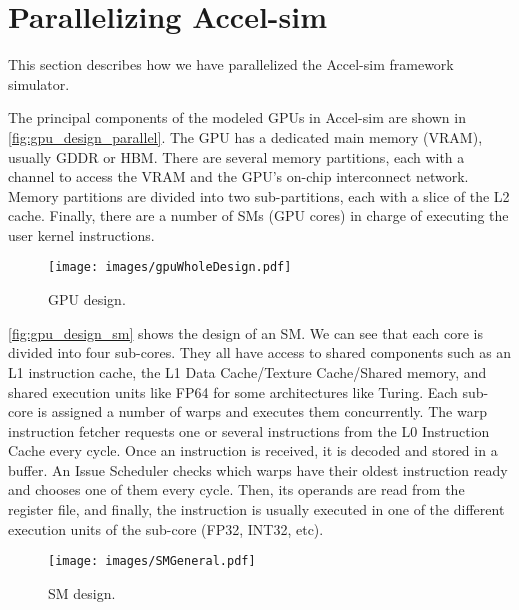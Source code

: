 \section{Parallelizing Accel-sim}\label{sec:work}

\par
This section describes how we have parallelized the Accel-sim framework simulator. 

\par
The principal components of the modeled GPUs in Accel-sim are shown in \autoref{fig:gpu_design_parallel}. The GPU has a dedicated main memory (VRAM), usually GDDR or HBM. There are several memory partitions, each with a channel to access the VRAM and the GPU's on-chip interconnect network. Memory partitions are divided into two sub-partitions, each with a slice of the L2 cache. Finally, there are a number of SMs (GPU cores) in charge of executing the user kernel instructions. 

\begin{figure}[ht]
  \centering
  \texttt{[image: images/gpuWholeDesign.pdf]}
  \caption{GPU design.}
  \label{fig:gpu_design_parallel}
\end{figure}

\par
\autoref{fig:gpu_design_sm} shows the design of an SM. We can see that each core is divided into four sub-cores. They all have access to shared components such as an L1 instruction cache, the L1 Data Cache/Texture Cache/Shared memory, and shared execution units like FP64 for some architectures like Turing. Each sub-core is assigned a number of warps and executes them concurrently. The warp instruction fetcher requests one or several instructions from the L0 Instruction Cache every cycle. Once an instruction is received, it is decoded and stored in a buffer. An Issue Scheduler checks which warps have their oldest instruction ready and chooses one of them every cycle. Then, its operands are read from the register file, and finally, the instruction is usually executed in one of the different execution units of the sub-core (FP32, INT32, etc).

\begin{figure}[ht]
  \centering
  \texttt{[image: images/SMGeneral.pdf]}
  \caption{SM design.}
  \label{fig:gpu_design_sm}
\end{figure}

